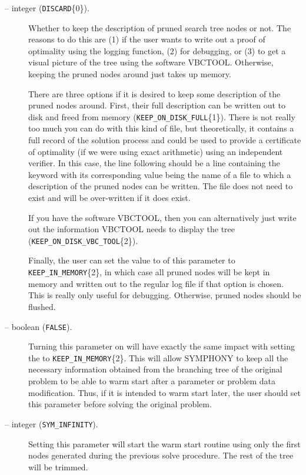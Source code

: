 \begin{description}
\item[ -- integer ({\tt DISCARD}\{0\}).] 
Whether to keep the description of pruned search tree nodes or not.
The reasons to do this are (1) if the user wants to write out a proof
of optimality using the logging function, (2) for debugging, or (3) to
get a visual picture of the tree using the software VBCTOOL.
Otherwise, keeping the pruned nodes around just takes up memory. 

There are three options if it is desired to keep some description of
the pruned nodes around. First, their full description can be written
out to disk and freed from memory ({\tt KEEP\_ON\_DISK\_FULL}\{1\}). There
is not really too much you can do with this kind of file, but
theoretically, it contains a full record of the solution process and
could be used to provide a certificate of optimality (if we were using
exact arithmetic) using an independent verifier. In this case, the
line following  should be a line
containing the keyword  with its
corresponding value being the name of a file to which a description of
the pruned nodes can be written. The file does not need to exist and
will be over-written if it does exist.

If you have the software VBCTOOL, then
you can alternatively just write out the information VBCTOOL needs to
display the tree ({\tt KEEP\_ON\_DISK\_VBC\_TOOL}\{2\}). 

Finally, the user can set the value to of this parameter to {\tt
KEEP\_IN\_MEMORY}\{2\}, in which case all pruned nodes will be kept in
memory and written out to the regular log file if that option is
chosen. This is really only useful for debugging. Otherwise, pruned
nodes should be flushed.

\item[ -- boolean ({\tt FALSE}).]
Turning this parameter on will have exactly the same impact with 
setting the  to 
{\tt KEEP\_IN\_MEMORY}\{2\}. This will allow SYMPHONY to keep all the
necessary information obtained from the branching tree of the original 
problem to be able to warm start after a parameter or problem data 
modification. Thus, if it is intended to warm start later, the user 
should set this parameter before solving the original problem.

\item[ -- integer ({\tt SYM\_INFINITY}).]
Setting this parameter will start the warm start routine using only the 
first  nodes generated during the 
previous solve procedure. The rest of the tree will be trimmed. 


\end{description}
